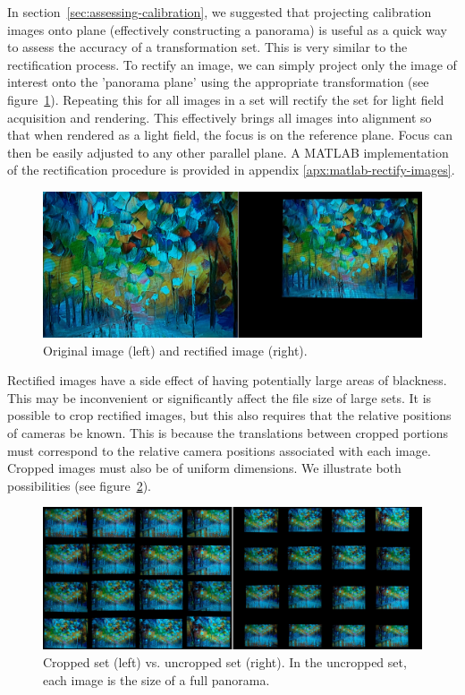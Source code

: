 \documentclass[../main.tex]{subfiles}
\begin{document}
In section~\ref{sec:assessing-calibration}, we suggested that projecting calibration images onto plane (effectively constructing a panorama) is useful as a quick way to assess the accuracy of a transformation set. This is very similar to the rectification process. To rectify an image, we can simply project only the image of interest onto the 'panorama plane' using the appropriate transformation (see figure~\ref{fig:rectification}). Repeating this for all images in a set will rectify the set for light field acquisition and rendering. This effectively brings all images into alignment so that when rendered as a light field, the focus is on the reference plane. Focus can then be easily adjusted to any other parallel plane. A MATLAB implementation of the rectification procedure is provided in appendix \ref{apx:matlab-rectify-images}.

\begin{figure}[H]
    \centering
    \includegraphics[width=\linewidth]{images/rectification}
    \caption{Original image (left) and rectified image (right).}
    \label{fig:rectification}
\end{figure}

\newpage
Rectified images have a side effect of having potentially large areas of blackness. This may be inconvenient or significantly affect the file size of large sets. It is possible to crop rectified images, but this also requires that the relative positions of cameras be known. This is because the translations between cropped portions must correspond to the relative camera positions associated with each image. Cropped images must also be of uniform dimensions. We illustrate both possibilities (see figure~\ref{fig:cropped-vs-uncropped}).

\begin{figure}[H]
    \centering
    \includegraphics[width=\linewidth]{images/cropped-vs-uncropped}
    \caption{Cropped set (left) vs. uncropped set (right). In the uncropped set, each image is the size of a full panorama.}
    \label{fig:cropped-vs-uncropped}
\end{figure}

\newpage
\end{document}
